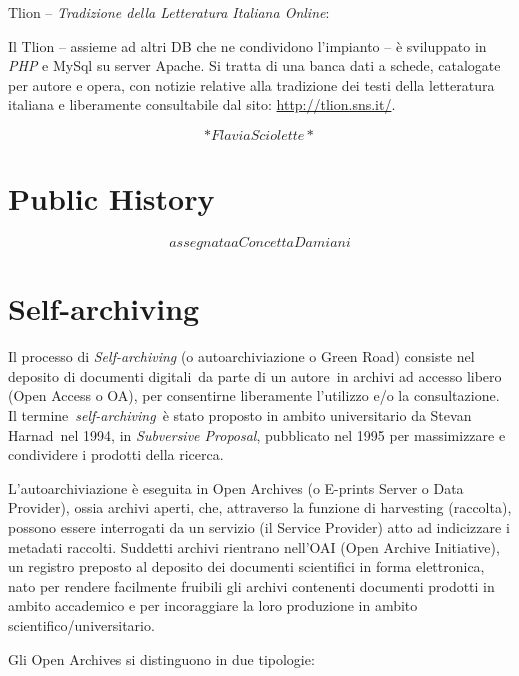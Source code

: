 \documentclass[
  b5paper,
  twoside,
  11pt,
  chapterprefix=false,
  bibliography=totocnumbered,
  listof=flat]{scrbook}
\begin{document}
Tlion -- \emph{Tradizione della Letteratura Italiana Online}:

Il Tlion -- assieme ad altri DB che ne condividono l'impianto -- è
sviluppato in \emph{PHP} e MySql su server Apache. Si tratta di una banca
dati a schede, catalogate per autore e opera, con notizie relative alla
tradizione dei testi della letteratura italiana e liberamente
consultabile dal sito: \url{http://tlion.sns.it/}.

\[*Flavia Sciolette*\]

\hypertarget{public-history}{%
\chapter{Public History}\label{public-history}}

\[assegnata a Concetta Damiani\]

\hypertarget{self-archiving}{%
\chapter{Self-archiving}\label{self-archiving}}

Il processo di \emph{Self-archiving} (o autoarchiviazione o Green Road)
consiste nel deposito di documenti digitali~da parte di un autore~in
archivi ad accesso libero (Open Access o OA), per consentirne
liberamente l'utilizzo e/o la consultazione. Il
termine~\emph{self-archiving}~è stato proposto in ambito universitario da
Stevan Harnad~nel 1994, in \emph{Subversive Proposal}, pubblicato nel 1995
per massimizzare e condividere i prodotti della ricerca.

L'autoarchiviazione è eseguita in Open Archives (o E-prints Server o
Data Provider), ossia archivi aperti, che, attraverso la funzione di
harvesting (raccolta), possono essere interrogati da un servizio (il
Service Provider) atto ad indicizzare i metadati raccolti. Suddetti
archivi rientrano nell'OAI (Open Archive Initiative), un registro
preposto al deposito dei documenti scientifici in forma elettronica,
nato per rendere facilmente fruibili gli archivi contenenti documenti
prodotti in ambito accademico e per incoraggiare la loro produzione in
ambito scientifico/universitario.

Gli Open Archives si distinguono in due tipologie:
\end{document}
